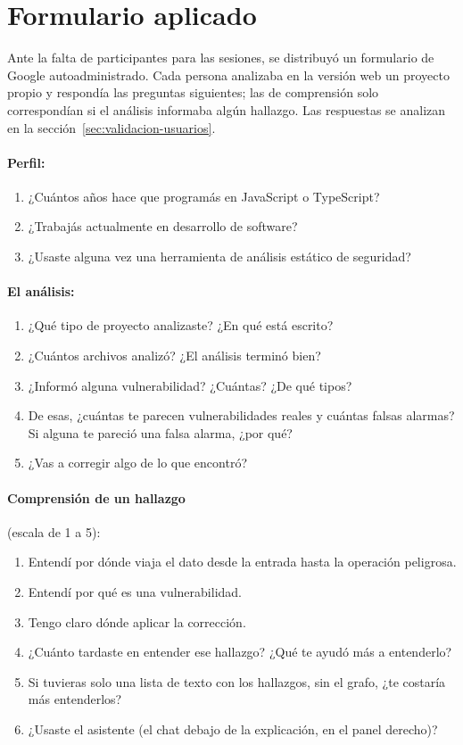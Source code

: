\section{Formulario aplicado}\label{sec:formulario-aplicado}

Ante la falta de participantes para las sesiones, se distribuyó un
formulario de Google autoadministrado. Cada persona analizaba en la
versión web un proyecto propio y respondía las preguntas siguientes; las
de comprensión solo correspondían si el análisis informaba algún
hallazgo. Las respuestas se analizan en la
sección~\ref{sec:validacion-usuarios}.

\paragraph{Perfil:}
\begin{enumerate}
    \item ¿Cuántos años hace que programás en JavaScript o TypeScript?
    \item ¿Trabajás actualmente en desarrollo de software?
    \item ¿Usaste alguna vez una herramienta de análisis estático de seguridad?
\end{enumerate}

\paragraph{El análisis:}
\begin{enumerate}[resume]
    \item ¿Qué tipo de proyecto analizaste? ¿En qué está escrito?
    \item ¿Cuántos archivos analizó? ¿El análisis terminó bien?
    \item ¿Informó alguna vulnerabilidad? ¿Cuántas? ¿De qué tipos?
    \item De esas, ¿cuántas te parecen vulnerabilidades reales y cuántas
          falsas alarmas? Si alguna te pareció una falsa alarma, ¿por qué?
    \item ¿Vas a corregir algo de lo que encontró?
\end{enumerate}

\paragraph{Comprensión de un hallazgo} (escala de 1 a 5):
\begin{enumerate}[resume]
    \item Entendí por dónde viaja el dato desde la entrada hasta la
          operación peligrosa.
    \item Entendí por qué es una vulnerabilidad.
    \item Tengo claro dónde aplicar la corrección.
    \item ¿Cuánto tardaste en entender ese hallazgo? ¿Qué te ayudó más a
          entenderlo?
    \item Si tuvieras solo una lista de texto con los hallazgos, sin el
          grafo, ¿te costaría más entenderlos?
    \item ¿Usaste el asistente (el chat debajo de la explicación, en el
          panel derecho)?
\end{enumerate}

